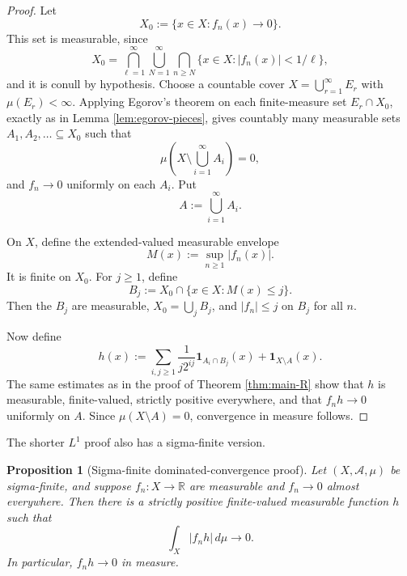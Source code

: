 \documentclass[11pt]{article}
\newcommand{\R}{\mathbb{R}}
\newcommand{\one}{\mathbf 1}
\newcommand{\mc}[1]{\mathcal{#1}}
\theoremstyle{plain}
\newtheorem{proposition}[theorem]{Proposition}
\theoremstyle{definition}
\theoremstyle{remark}
\begin{document}
\begin{proof}
Let
\[
        X_0:=\{x\in X:f_n(x)\to 0\}.
\]
This set is measurable, since
\[
        X_0=
        \bigcap_{\ell=1}^\infty
        \bigcup_{N=1}^\infty
        \bigcap_{n\geq N}\{x\in X:|f_n(x)|<1/\ell\},
\]
and it is conull by hypothesis.  Choose a countable cover
$X=\bigcup_{r=1}^\infty E_r$ with $\mu(E_r)<\infty$.  Applying Egorov's
theorem on each finite-measure set $E_r\cap X_0$, exactly as in
Lemma \ref{lem:egorov-pieces}, gives countably many measurable sets
$A_1,A_2,\dots\subseteq X_0$ such that
\[
        \mu\left(X\setminus \bigcup_{i=1}^\infty A_i\right)=0,
\]
and $f_n\to 0$ uniformly on each $A_i$.  Put
\[
        A:=\bigcup_{i=1}^\infty A_i.
\]

On $X$, define the extended-valued measurable envelope
\[
        M(x):=\sup_{n\geq 1}|f_n(x)|.
\]
It is finite on $X_0$.  For $j\geq 1$, define
\[
        B_j:=X_0\cap\{x\in X:M(x)\leq j\}.
\]
Then the $B_j$ are measurable, $X_0=\bigcup_j B_j$, and
$|f_n|\leq j$ on $B_j$ for all $n$.

Now define
\[
        h(x)
        :=
        \sum_{i,j\geq 1}\frac{1}{j2^{ij}}\one_{A_i\cap B_j}(x)
        +\one_{X\setminus A}(x).
\]
The same estimates as in the proof of Theorem \ref{thm:main-R} show that
$h$ is measurable, finite-valued, strictly positive everywhere, and that
$f_nh\to 0$ uniformly on $A$.  Since $\mu(X\setminus A)=0$, convergence in
measure follows.
\end{proof}

The shorter $L^1$ proof also has a sigma-finite version.

\begin{proposition}[Sigma-finite dominated-convergence proof]\label{prop:l1-sigma-finite}
Let $(X,\mc A,\mu)$ be sigma-finite, and suppose $f_n:X\to\R$ are measurable
and $f_n\to 0$ almost everywhere.  Then there is a strictly positive
finite-valued measurable function $h$ such that
\[
        \int_X |f_nh|\,d\mu\longrightarrow 0.
\]
In particular, $f_nh\to 0$ in measure.
\end{proposition}
\end{document}
